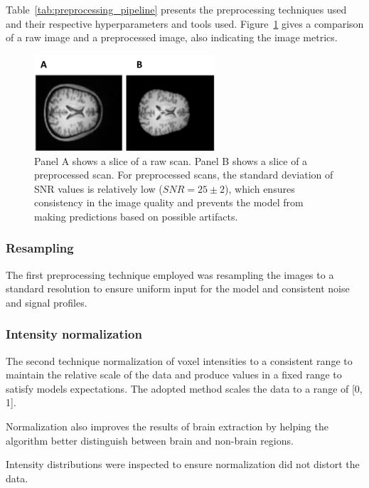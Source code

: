 Table~\ref{tab:preprocessing_pipeline} presents the preprocessing techniques used and their respective hyperparameters and tools used. Figure~\ref{fig:slice_comparison} gives a comparison of a raw image and a preprocessed image, also indicating the image metrics.
%
\begin{figure}[h]
    \centering
    \includegraphics[width=0.6\textwidth]{./figs/slice_comparison.png} %
    \caption{Panel A shows a slice of a raw scan. Panel B shows a slice of a preprocessed scan. For preprocessed scans, the standard deviation of SNR values is relatively low (\mbox{$SNR= 25 \pm 2$}), which ensures consistency in the image quality and prevents the model from making predictions based on possible artifacts.}\label{fig:slice_comparison}
\end{figure}

\subsubsection{Resampling}

The first preprocessing technique employed was resampling the images to a standard resolution to ensure uniform input for the model and consistent noise and signal profiles.

\subsubsection{Intensity normalization}

The second technique normalization of voxel intensities to a consistent range to maintain the relative scale of the data and produce values in a fixed range to satisfy models expectations. The adopted method scales the data to a range of [0, 1].

Normalization also improves the results of brain extraction by helping the algorithm better distinguish between brain and non-brain regions.

Intensity distributions were inspected to ensure normalization did not distort the data.

